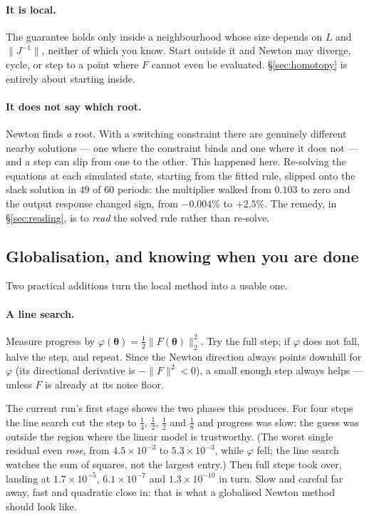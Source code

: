 \documentclass[10pt,a4paper]{article}
\theoremstyle{plain}
\theoremstyle{remark}
\newcommand{\pol}{\bm{\theta}}
\begin{document}
\paragraph{It is local.} The guarantee holds only inside a neighbourhood whose size depends on
$L$ and $\|J^{-1}\|$, neither of which you know. Start outside it and Newton may diverge,
cycle, or step to a point where $F$ cannot even be evaluated. \S\ref{sec:homotopy} is entirely
about starting inside.

\paragraph{It does not say which root.} Newton finds \emph{a} root. With a switching constraint
there are genuinely different nearby solutions --- one where the constraint binds and one where
it does not --- and a step can slip from one to the other. This happened here. Re-solving the
equations at each simulated state, starting from the fitted rule, slipped onto the slack
solution in $49$ of $60$ periods: the multiplier walked from $0.103$ to zero and the output
response changed sign, from $-0.004\%$ to $+2.5\%$. The remedy, in \S\ref{sec:reading}, is to
\emph{read} the solved rule rather than re-solve.

\subsection{Globalisation, and knowing when you are done}

Two practical additions turn the local method into a usable one.

\paragraph{A line search.} Measure progress by $\varphi(\pol)=\tfrac12\|F(\pol)\|_2^2$. Try the
full step; if $\varphi$ does not fall, halve the step, and repeat. Since the Newton direction
always points downhill for $\varphi$ (its directional derivative is $-\|F\|^2<0$), a small enough
step always helps --- unless $F$ is already at its noise floor.

The current run's first stage shows the two phases this produces. For four steps the line search cut
the step to $\tfrac14$, $\tfrac12$, $\tfrac12$ and $\tfrac18$ and progress was slow: the guess was
outside the region where the linear model is trustworthy. (The worst single residual even
\emph{rose}, from $4.5\times10^{-3}$ to $5.3\times10^{-3}$, while $\varphi$ fell; the line search watches
the sum of squares, not the largest entry.) Then full steps took over, landing at $1.7\times10^{-5}$, $6.1\times10^{-7}$ and
$1.3\times10^{-10}$ in turn. Slow and careful far away, fast
and quadratic close in: that is what a globalised Newton method should look like.
\end{document}

